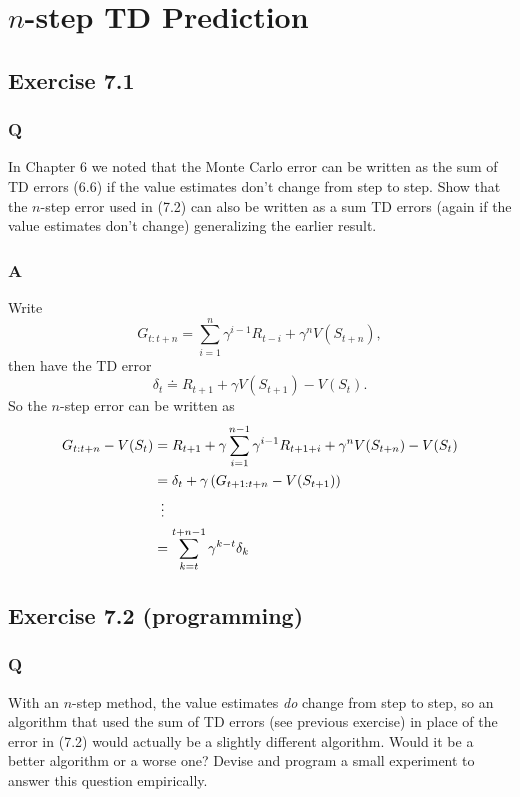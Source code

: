 \section{$n$-step TD Prediction}
\subsection{Exercise 7.1}
\subsubsection*{Q}
In Chapter 6 we noted that the Monte Carlo error can be written as the sum of TD errors (6.6) if the value estimates don’t change from step to step. Show that the $n$-step error used in (7.2) can also be written as a sum TD errors (again if the value estimates don’t change) generalizing the earlier result.

\subsubsection*{A}
Write
\[
    G_{t:t+n} = \sum_{i=1}^n \gamma^{i-1}R_{t-i} + \gamma^n V(S_{t+n}),
\]
then have the TD error
\[
    \delta_t \doteq R_{t+1} + \gamma V(S_{t+1}) - V(S_t).
\]
So the $n$-step error can be written as
\begin{align*}
    G_{t:t+n} - V(S_t) &= R_{t+1} + \gamma \sum_{i=1}^{n-1} \gamma^{i-1} R_{t+1+i} + \gamma^n V(S_{t+n}) - V(S_t) \\
                       &= \delta_t + \gamma \left( G_{t+1:t+n} - V(S_{t+1}) \right) \\
                       &\vdotswithin{=}\\
                       &= \sum_{k=t}^{t+n-1} \gamma^{k-t} \delta_k
\end{align*}


\subsection{Exercise 7.2 (programming)}
\subsubsection*{Q}
With an $n$-step method, the value estimates \emph{do} change from step to step, so an algorithm that used the sum of TD errors (see previous exercise) in place of the error in (7.2) would actually be a slightly different algorithm. Would it be a better algorithm or a worse one? Devise and program a small experiment to answer this question empirically.

